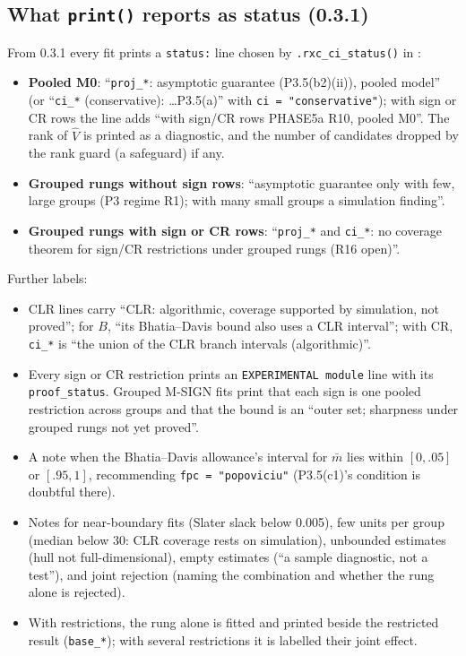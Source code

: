 \subsection{What \texttt{print()} reports as status (0.3.1)}

From 0.3.1 every fit prints a \texttt{status:} line chosen by
\texttt{.rxc\_ci\_status()} in :
\begin{itemize}[nosep]
\item \textbf{Pooled M0}: ``\texttt{proj\_*}: asymptotic guarantee (P3.5(b2)(ii)),
pooled model'' (or ``\texttt{ci\_*} (conservative): \ldots P3.5(a)'' with
\texttt{ci = "conservative"}); with sign or CR rows the line adds ``with sign/CR
rows PHASE5a R10, pooled M0''. The rank of $\hat V$ is printed as a diagnostic, and
the number of candidates dropped by the rank guard (a safeguard) if any.
\item \textbf{Grouped rungs without sign rows}: ``asymptotic guarantee only with few,
large groups (P3 regime R1); with many small groups a simulation finding''.
\item \textbf{Grouped rungs with sign or CR rows}: ``\texttt{proj\_*} and
\texttt{ci\_*}: no coverage theorem for sign/CR restrictions under grouped rungs
(R16 open)''.
\end{itemize}
Further labels:
\begin{itemize}[nosep]
\item CLR lines carry ``CLR: algorithmic, coverage supported by simulation, not
proved''; for $B$, ``its Bhatia--Davis bound also uses a CLR interval''; with CR,
\texttt{ci\_*} is ``the union of the CLR branch intervals (algorithmic)''.
\item Every sign or CR restriction prints an \texttt{EXPERIMENTAL module} line with
its \texttt{proof\_status}. Grouped M-SIGN fits print that each sign is one pooled
restriction across groups and that the bound is an ``outer set; sharpness under
grouped rungs not yet proved''.
\item A note when the Bhatia--Davis allowance's interval for $\bar m$ lies within
$[0,.05]$ or $[.95,1]$, recommending \texttt{fpc = "popoviciu"} (P3.5(c1)'s
condition is doubtful there).
\item Notes for near-boundary fits (Slater slack below 0.005), few units per group
(median below 30: CLR coverage rests on simulation), unbounded estimates
(hull not full-dimensional), empty estimates (``a sample diagnostic, not a test''),
and joint rejection (naming the combination and whether the rung alone is
rejected).
\item With restrictions, the rung alone is fitted and printed beside the restricted
result (\texttt{base\_*}); with several restrictions it is labelled their joint
effect.
\end{itemize}

